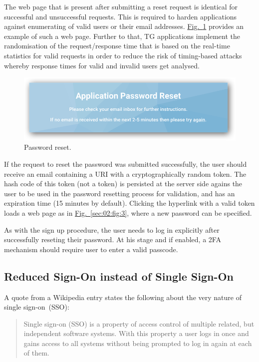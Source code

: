 \documentclass[a4paper,12pt,oneside,openright]{memoir}
\begin{document}
	
	The web page that is present after submitting a reset request is identical for successful and unsuccessful requests.
	This is required to harden applications against enumerating of valid users or their email addresses.
	\hyperref[sec:02:fig:4]{Fig.~\ref*{sec:02:fig:4}} provides an example of such a web page.
	Further to that, TG applications implement the randomisation of the request/response time that is based on the real-time statistics for valid requests in order to reduce the risk of timing-based attacks whereby response times for valid and invalid users get analysed.

	\begin{figure}[h!tbp]
	\centering
	\includegraphics[width=0.7\linewidth]{images/05-password-reset.png}
	\caption{Password reset.}\label{sec:02:fig:4}
	\end{figure}
	
	If the request to reset the password was submitted successfully, the user should receive an email containing a URI with a cryptographically random token.
	The hash code of this token (not a token) is persisted at the server side agains the user to be used in the password resetting process for validation, and has an expiration time (15 minutes by default).
	Clicking the hyperlink with a valid token loads a web page as in \hyperref[sec:02:fig:3]{Fig.~\ref*{sec:02:fig:3}}, where a new password can be specified.

	As with the sign up procedure, the user needs to log in explicitly after successfully reseting their password.
	At his stage and if enabled, a 2FA mechanism should require user to enter a valid passcode.

\subsection*{Reduced Sign-On instead of Single Sign-On}
	A quote from a Wikipedia entry states the following about the very nature of single sign-on~(SSO):

	\begin{quote}
	Single sign-on (SSO) is a property of access control of multiple related, but independent software systems.
	With this property a user logs in once and gains access to all systems without being prompted to log in again at each of them.
	\end{quote}
\end{document}
